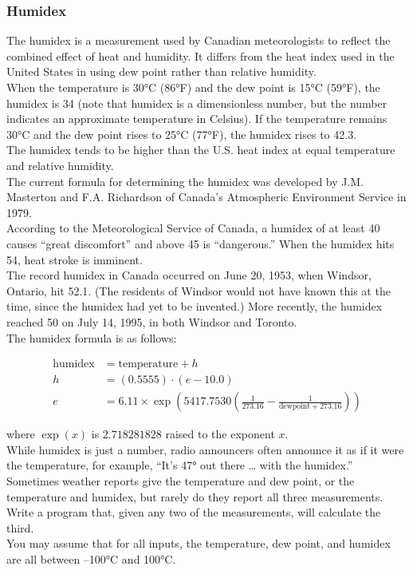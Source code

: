 \documentclass{article}
\begin{document}


\subsubsection{Humidex}

The humidex is a measurement used by Canadian meteorologists to reflect the combined effect of heat and humidity. It differs from the heat index used in the United States in using dew point rather than relative humidity.\\
When the temperature is 30°C (86°F) and the dew point is 15°C (59°F), the humidex is 34 (note that humidex is a dimensionless number, but the number indicates an approximate temperature in Celsius). If the temperature remains 30°C and the dew point rises to 25°C (77°F), the
humidex rises to 42.3. \\
The humidex tends to be higher than the U.S. heat index at equal temperature and relative humidity. \\
The current formula for determining the humidex was developed by J.M. Masterton and F.A. Richardson of Canada’s Atmospheric Environment Service in 1979. \\
According to the Meteorological Service of Canada, a humidex of at least 40 causes “great discomfort” and above 45 is “dangerous.” When the humidex hits 54, heat stroke is imminent. \\
The record humidex in Canada occurred on June 20, 1953, when Windsor, Ontario, hit 52.1. (The residents of Windsor would not have known this at the time, since the humidex had yet to be invented.) More recently, the humidex reached 50 on July 14, 1995, in both Windsor and Toronto.\\

The humidex formula is as follows: 

\begin{align*}
    \text{humidex} &= \text{temperature} + h \\
    h &= (0.5555) \cdot (e - 10.0) \\
    e &= 6.11 \times \exp \left( 5417.7530 \left( \frac{1}{273.16} - \frac{1}{\text{dewpoint} + 273.16} \right) \right)
\end{align*}

where \( \exp(x) \) is \( 2.718281828 \) raised to the exponent \( x \). \\

While humidex is just a number, radio announcers often announce it as if it were the temperature, for example, “It’s 47° out there … with the humidex.” Sometimes weather reports give the temperature and dew point, or the temperature and humidex, but rarely do they report all three
measurements. Write a program that, given any two of the measurements, will calculate the third.\\
You may assume that for all inputs, the temperature, dew point, and humidex are all between
–100°C and 100°C.
\end{document}
